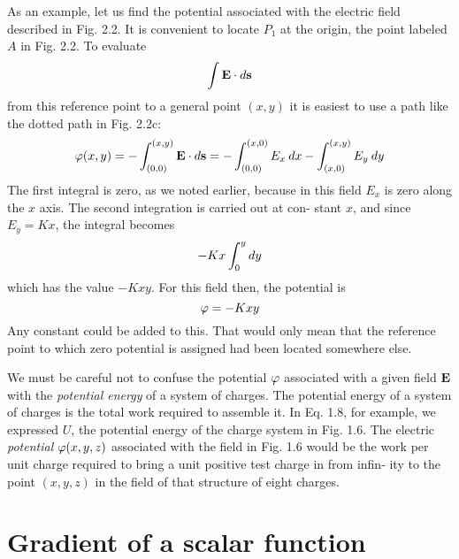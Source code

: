 As an example, let us find the potential associated with the electric
field described in Fig. 2.2. It is convenient to locate $P_1$ at the origin,
the point labeled $A$ in Fig. 2.2. To evaluate
\begin{equation}
  \int\mathbf{E}\cdot d\mathbf{s}
\end{equation}
from this reference point to a general point $(x,y)$ it is easiest to use
a path like the dotted path in Fig. 2.2c:
\begin{equation}
  \varphi(x,y) = -\int_{(0,0)}^{(x,y)}\mathbf{E}\cdot d\mathbf{s}
            = -\int_{(0,0)}^{(x,0)} E_x \: d x - \int_{(x,0)}^{(x,y)} E_y \: d y
\end{equation}
The first integral is zero, as we noted earlier, because in this field $E_x$
is zero along the $x$ axis. The second integration is carried out at con-
stant $x$, and since $E_y = Kx$, the integral becomes
\begin{equation}
  -Kx\int_0^y d y
\end{equation}
which has the value $-Kxy$. For this field then, the potential is
\begin{equation}
  \varphi = -Kxy
\end{equation}
Any constant could be added to this. That would only mean that the
reference point to which zero potential is assigned had been located
somewhere else.

We must be careful not to confuse the potential $\varphi$ associated with
a given field $\mathbf{E}$ with the \emph{potential energy} of a system of charges. The
potential energy of a system of charges is the total work required to
assemble it. In Eq. 1.8, for example, we expressed $U$, the potential
energy of the charge system in Fig. 1.6. The electric \emph{potential}
$\varphi(x,y,z)$ associated with the field in Fig. 1.6 would be the work per
unit charge required to bring a unit positive test charge in from infin-
ity to the point $(x,y,z)$ in the field of that structure of eight charges.

\section{Gradient of a scalar function}


